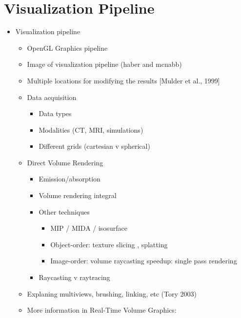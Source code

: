 \section{Visualization Pipeline} \label{cha:intro:vp}
\begin{itemize}
  \item Visualization pipeline
  \begin{itemize}
    \item OpenGL Graphics pipeline \cite{segal2016opengl}
    \item Image of visualization pipeline (haber and mcnabb)

    \item Multiple locations for modifying the results [Mulder et al., 1999]
    \item Data acquisition
    \begin{itemize}
      \item Data types
      \item Modalities (CT, MRI, simulations)
      \item Different grids (cartesian v spherical)
    \end{itemize}
    \item Direct Volume Rendering
    \begin{itemize}
      \item Emission/absorption \cite{sabella1988rendering}
      \item Volume rendering integral \cite{max1995optical}
      \item Other techniques
      \begin{itemize}
        \item MIP / MIDA / isosurface
        \item Object-order: texture slicing \cite{westermann1998efficiently}, splatting \cite{westover1990footprint}
        \item Image-order: volume raycasting \cite{levoy1988display, drebin1988volume,sabella1988rendering} speedup: \cite{kruger2003acceleration} single pass rendering \cite{hadwiger2005real, stegmaier2005simple}
      \end{itemize}
      \item Raycasting v raytracing
    \end{itemize}
    \item Explaning multiviews, brushing, linking, etc (Tory 2003)
    \item More information in Real-Time Volume Graphics: \cite{engel2006real}
  \end{itemize}
\end{itemize}

